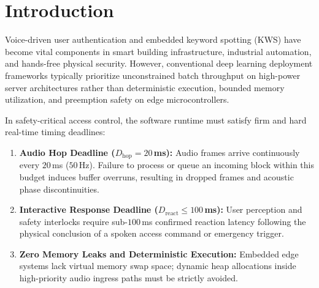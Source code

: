 \documentclass[10pt,twocolumn,letterpaper]{article}
\begin{document}
\section{Introduction}

Voice-driven user authentication and embedded keyword spotting (KWS) have become vital components in smart building infrastructure, industrial automation, and hands-free physical security. However, conventional deep learning deployment frameworks typically prioritize unconstrained batch throughput on high-power server architectures rather than deterministic execution, bounded memory utilization, and preemption safety on edge microcontrollers.

In safety-critical access control, the software runtime must satisfy firm and hard real-time timing deadlines:
\begin{enumerate}
    \item \textbf{Audio Hop Deadline ($D_{\text{hop}} = 20$\,ms):} Audio frames arrive continuously every $20$\,ms ($50$\,Hz). Failure to process or queue an incoming block within this budget induces buffer overruns, resulting in dropped frames and acoustic phase discontinuities.
    \item \textbf{Interactive Response Deadline ($D_{\text{react}} \le 100$\,ms):} User perception and safety interlocks require sub-$100$\,ms confirmed reaction latency following the physical conclusion of a spoken access command or emergency trigger.
    \item \textbf{Zero Memory Leaks and Deterministic Execution:} Embedded edge systems lack virtual memory swap space; dynamic heap allocations inside high-priority audio ingress paths must be strictly avoided.
\end{enumerate}
\end{document}
